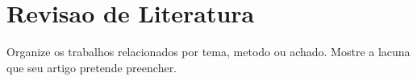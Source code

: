 \section{Revisao de Literatura}

Organize os trabalhos relacionados por tema, metodo ou achado. Mostre a lacuna que seu artigo pretende preencher.